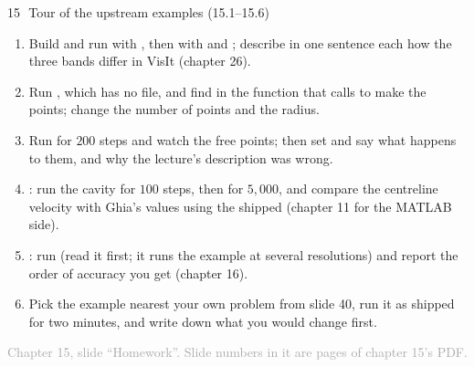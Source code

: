 \documentclass[aspectratio=169,11pt]{beamer}
\newcommand{\sourcecredit}[1]{\vfill\begin{flushright}\tiny\textcolor{DarkGray}{#1}\end{flushright}}
\begin{document}
\begin{frame}{15\,\textbullet\ Tour of the upstream examples (15.1--15.6)}
\label{fr:c15x1}
\footnotesize
\begin{enumerate}
  \item[15.1] Build and run  with , then with  and ; describe in one sentence each how the three bands differ in VisIt (chapter 26).
  \item[15.2] Run , which has no  file, and find in  the function that  calls to make the points; change the number of points and the radius.
  \item[15.3] Run  for $200$ steps and watch the free points; then set  and say what happens to them, and why the lecture's description was wrong.
  \item[15.4] : run the cavity for $100$ steps, then for $5{,}000$, and compare the centreline velocity with Ghia's values using the shipped  (chapter 11 for the MATLAB side).
  \item[15.5] : run  (read it first; it runs the example at several resolutions) and report the order of accuracy you get (chapter 16).
  \item[15.6] Pick the example nearest your own problem from slide 40, run it as shipped for two minutes, and write down what you would change first.
\end{enumerate}
\sourcecredit{Chapter 15, slide ``Homework''. Slide numbers in it are pages of chapter 15's PDF.}
\end{frame}
\end{document}
